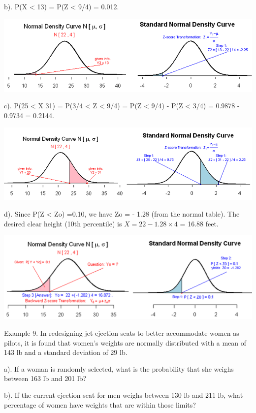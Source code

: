 \documentclass[
]{book}
\begin{document}
b). P(X \textless{} 13) = P(Z \textless{} 9/4) = 0.012.

\hfill\break

\begin{center}\includegraphics[width=0.6\linewidth]{week04/example08b} \end{center}

c). P(25 \textless{} X 31) = P(3/4 \textless{} Z \textless{} 9/4) = P(Z \textless{} 9/4) - P(Z \textless{} 3/4) = 0.9878 - 0.9734 = 0.2144.

\hfill\break

\begin{center}\includegraphics[width=0.6\linewidth]{week04/example08c} \end{center}

d). Since P(Z \textless{} Zo) =0.10, we have Zo = - 1.28 (from the normal table). The desired clear height (10th percentile) is \(X = 22-1.28\times4\) = 16.88 feet.

\hfill\break

\begin{center}\includegraphics[width=0.6\linewidth]{week04/example08d} \end{center}

Example 9. In redesigning jet ejection seats to better accommodate women as pilots, it is found that women's weights are normally distributed with a mean of 143 lb and a standard deviation of 29 lb.

a). If a woman is randomly selected, what is the probability that she weighs between 163 lb and 201 lb?

b). If the current ejection seat for men weighs between 130 lb and 211 lb, what percentage of women have weights that are within those limits?
\end{document}
